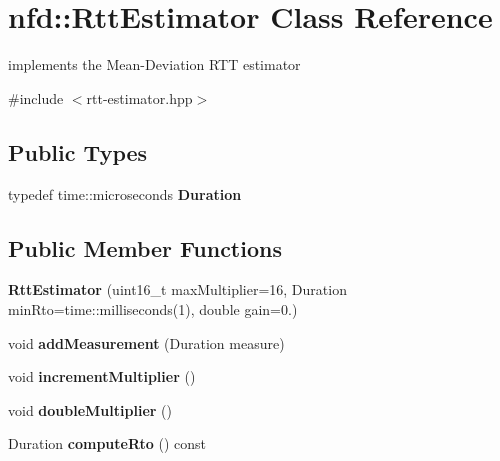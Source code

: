 \hypertarget{classnfd_1_1RttEstimator}{}\section{nfd\+:\+:Rtt\+Estimator Class Reference}
\label{classnfd_1_1RttEstimator}


implements the Mean-\/\+Deviation R\+TT estimator  




{\ttfamily \#include $<$rtt-\/estimator.\+hpp$>$}

\subsection*{Public Types}
\begin{DoxyCompactItemize}
\item 
typedef time\+::microseconds {\bfseries Duration}\hypertarget{classnfd_1_1RttEstimator_a1895480f45c43aa8ed4e7a5a880cc861}{}\label{classnfd_1_1RttEstimator_a1895480f45c43aa8ed4e7a5a880cc861}

\end{DoxyCompactItemize}
\subsection*{Public Member Functions}
\begin{DoxyCompactItemize}
\item 
{\bfseries Rtt\+Estimator} (uint16\+\_\+t max\+Multiplier=16, Duration min\+Rto=time\+::milliseconds(1), double gain=0.)\hypertarget{classnfd_1_1RttEstimator_a54a1fb2fc75da5a7dc8d13d84141b5b7}{}\label{classnfd_1_1RttEstimator_a54a1fb2fc75da5a7dc8d13d84141b5b7}

\item 
void {\bfseries add\+Measurement} (Duration measure)\hypertarget{classnfd_1_1RttEstimator_a1f00fe932f64241b8b71523a19e763c5}{}\label{classnfd_1_1RttEstimator_a1f00fe932f64241b8b71523a19e763c5}

\item 
void {\bfseries increment\+Multiplier} ()\hypertarget{classnfd_1_1RttEstimator_aa663be5b6508d76bb26e4d04b37ee46e}{}\label{classnfd_1_1RttEstimator_aa663be5b6508d76bb26e4d04b37ee46e}

\item 
void {\bfseries double\+Multiplier} ()\hypertarget{classnfd_1_1RttEstimator_a4542436059e9430ea84cd8f6e9b93b8b}{}\label{classnfd_1_1RttEstimator_a4542436059e9430ea84cd8f6e9b93b8b}

\item 
Duration {\bfseries compute\+Rto} () const\hypertarget{classnfd_1_1RttEstimator_a030357af665e019afdea5ecbe35f03c5}{}\label{classnfd_1_1RttEstimator_a030357af665e019afdea5ecbe35f03c5}

\end{DoxyCompactItemize}
